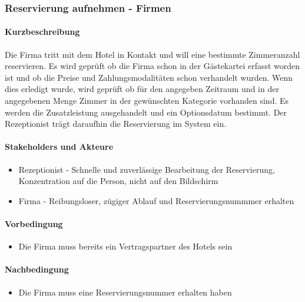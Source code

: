 \subsubsection{Reservierung aufnehmen - Firmen}
\label{UseCase_ReservierungAufnehmenFirmen}

\paragraph{Kurzbeschreibung}  
Die Firma tritt mit dem Hotel in Kontakt und will eine bestimmte \Gls{Zimmer}anzahl reservieren. Es wird geprüft ob die Firma schon in der Gästekartei erfasst worden ist und ob die Preise und Zahlungsmodalitäten schon verhandelt wurden. Wenn dies erledigt wurde, wird geprüft ob für den angegeben Zeitraum und in der angegebenen Menge \Gls{Zimmer} in der gewünschten Kategorie vorhanden sind. Es werden die \Gls{Zusatzleistung} ausgehandelt und ein \Gls{Optionsdatum} bestimmt. Der \Gls{Rezeptionist} trägt daraufhin die \Gls{Reservierung} im System ein.

\paragraph{Stakeholders und Akteure}
\begin{itemize}
	\item \Gls{Rezeptionist} - Schnelle und zuverlässige Bearbeitung der \Gls{Reservierung}, Konzentration auf die Person, nicht auf den Bildschirm
	\item Firma - Reibungsloser, zügiger Ablauf und Reservierungsnummmer erhalten
\end{itemize}

\paragraph{Vorbedingung}
\begin{itemize}
	\item Die Firma muss bereits ein Vertragspartner des Hotels sein
\end{itemize}

\paragraph{Nachbedingung}
\begin{itemize}
	\item Die Firma muss eine \Gls{Reservierungsnummer} erhalten haben
\end{itemize}

